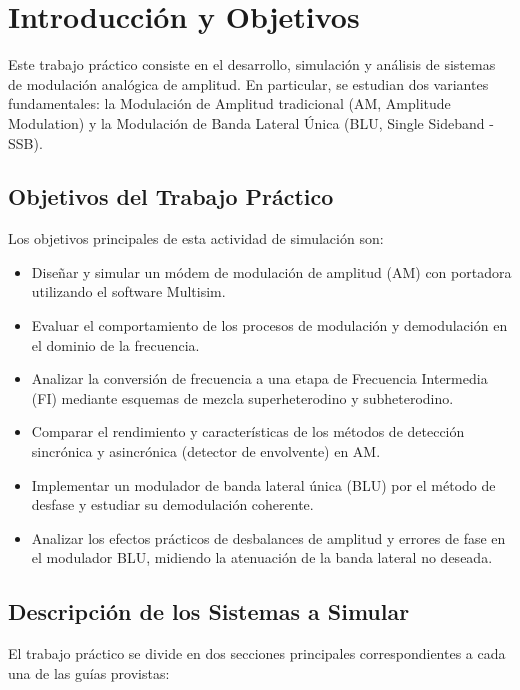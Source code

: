 \chapter{Introducción y Objetivos}
\label{sec:introduccion}

Este trabajo práctico consiste en el desarrollo, simulación y análisis de sistemas de modulación analógica de
amplitud. En particular, se estudian dos variantes fundamentales: la Modulación de Amplitud tradicional (AM,
Amplitude Modulation) y la Modulación de Banda Lateral Única (BLU, Single Sideband - SSB).

\section{Objetivos del Trabajo Práctico}

Los objetivos principales de esta actividad de simulación son:
\begin{itemize}
    \item Diseñar y simular un módem de modulación de amplitud (AM) con portadora utilizando el software Multisim.
    \item Evaluar el comportamiento de los procesos de modulación y demodulación en el dominio de la frecuencia.
    \item Analizar la conversión de frecuencia a una etapa de Frecuencia Intermedia (FI) mediante esquemas de
          mezcla superheterodino y subheterodino.
    \item Comparar el rendimiento y características de los métodos de detección sincrónica y asincrónica
          (detector de envolvente) en AM.
    \item Implementar un modulador de banda lateral única (BLU) por el método de desfase y estudiar su
          demodulación coherente.
    \item Analizar los efectos prácticos de desbalances de amplitud y errores de fase en el modulador BLU, midiendo
          la atenuación de la banda lateral no deseada.
\end{itemize}

\section{Descripción de los Sistemas a Simular}

El trabajo práctico se divide en dos secciones principales correspondientes a cada una de las guías provistas:

